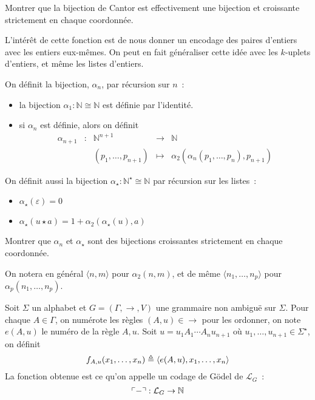 \begin{exercise}
  Montrer que la bijection de Cantor est effectivement une bijection et
  croissante strictement en chaque coordonnée.
\end{exercise}

L'intérêt de cette fonction est de nous donner un encodage des paires d'entiers
avec les entiers eux-mêmes. On peut en fait généraliser cette idée avec les
$k$-uplets d'entiers, et même les listes d'entiers.

\begin{definition}
  On définit la  bijection, $\alpha_n$, par
  récursion sur $n$~:
  \begin{itemize}
  \item la bijection $\alpha_1 : \mathbb N \cong \mathbb N$ est définie par
    l'identité.
  \item si $\alpha_n$ est définie, alors on définit
    \[\begin{array}{ccccc}
    \alpha_{n+1} & : & \mathbb N^{n+1} & \longrightarrow & \mathbb N\\
    & & (p_1,\ldots,p_{n+1}) & \longmapsto &
    \alpha_2(\alpha_n(p_1,\ldots,p_n),p_{n+1})
    \end{array}\]
  \end{itemize}

  On définit aussi la bijection $\alpha_\star : \mathbb N^\star \cong \mathbb N$
  par récursion sur les listes~:
  \begin{itemize}
  \item $\alpha_\star (\varepsilon) = 0$
  \item $\alpha_\star (u\star a) = 1 + \alpha_2(\alpha_\star(u),a)$
  \end{itemize}
\end{definition}

\begin{exercise}
  Montrer que $\alpha_n$ et $\alpha_\star$ sont des bijections croissantes
  strictement en chaque coordonnée.
\end{exercise}

\begin{notation}
  On notera en général $\langle n,m\rangle$ pour $\alpha_2(n,m)$, et de même
  $\langle n_1,\ldots,n_p\rangle$ pour $\alpha_p(n_1,\ldots,n_p)$.
\end{notation}

\begin{definition}
  Soit $\Sigma$ un alphabet et $G=(\Gamma,\to,V)$ une grammaire non ambiguë sur
  $\Sigma$. Pour chaque $A \in \Gamma$, on numérote les règles $(A,u) \in \to$
  pour les ordonner, on note $e(A,u)$ le numéro de la règle $A,u$. Soit
  $u = u_1A_1\cdots A_nu_{n+1}$ où $u_1,\ldots,u_{n+1}\in\Sigma^\star$, on définit
  \[f_{A,u}(x_1,\ldots,x_n)\triangleq \langle e(A,u),x_1,\ldots,x_n\rangle\]
  La fonction obtenue est ce qu'on appelle un codage de Gödel de
  $\mathcal L_G$~:
  \[\ulcorner-\urcorner : \mathcal L_G \to \mathbb N\]
\end{definition}

